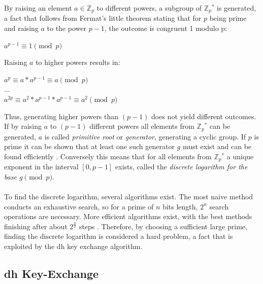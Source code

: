 By raising an element $a \in \mathbb{Z}_p$ to different powers, a subgroup of $\mathbb{Z}{_p}^*$
is generated, a fact that follows from Fermat's little theorem stating that for $p$ being prime and raising $a$ to the power $p-1$, the outcome is congruent 1
modulo p:
\begin{center}
 $a^{p-1} \equiv 1 \pmod p $ \\
\end{center}
Raising $a$ to higher powers results in:

\begin{center}
 $a^{p} \equiv a*a^{p-1} \equiv a \pmod p$ \\
 $...$ \\
 $a^{2p} \equiv a^2 * a^{p-1} * a^{p-1} \equiv a^2 \pmod p$
\end{center}
Thus, generating higher powers than $(p-1)$ does not yield different outcomes. If by raising $a$ to $(p-1)$ different powers all elements from $\mathbb{Z}{_p}^*$ can
be generated, $a$ is called \textit{primitive root} or \textit{generator}, generating a cyclic group.
If $p$ is prime it can be shown that at least one such generator $g$ must exist and can be found efficiently \cite{primitiveRoot}.
Conversely this means that for all elements from  $\mathbb{Z}{_p}^*$ a unique exponent in the interval $[0, p-1]$ exists,
called the \textit{discrete logarithm for the base $ g \pmod p$}.
\\
\\
To find
the discrete logarithm, several algorithms exist. The most naive method conducts an exhaustive search, so for a prime of $n$ bits length, $2^n$ search operations
are necessary. More efficient algorithms exist, with the best methods finishing after about $2^{\frac{n}{2}}$ steps \cite{5199978}. 
Therefore, by choosing a sufficient large prime, finding the discrete logarithm is considered a hard problem, a fact
that is exploited by the \gls{dh} key exchange algorithm.

\subsection{\gls{dh} Key-Exchange}

